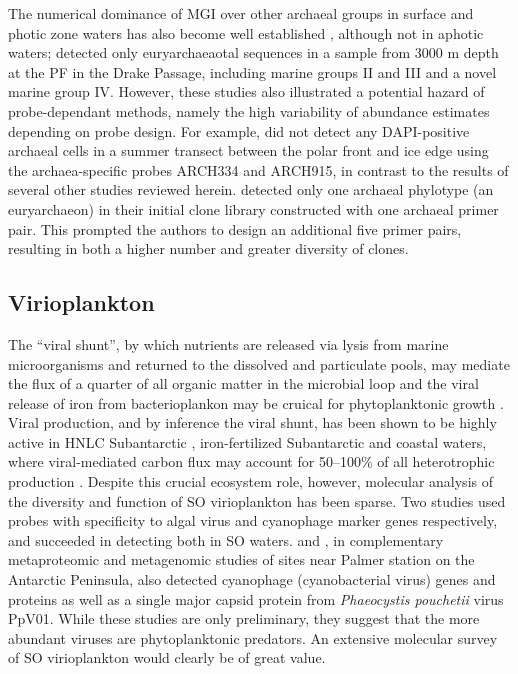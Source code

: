 The numerical dominance of \ac{MGI} over other archaeal groups in surface and photic zone waters has also become well established \citep[e.g.][]{DeLong:1994id,Massana:2000bg}, although not in aphotic waters; \citet{LopezGarcia:2001vp} detected only euryarchaeaotal sequences in a sample from 3000 m depth at the \ac{PF} in the Drake Passage, including marine groups II and III and a novel marine group IV.
However, these studies also illustrated a potential hazard of probe-dependant methods, namely the high variability of abundance estimates depending on probe design.
For example, \cite{Simon:1999ux} did not detect any DAPI-positive archaeal cells in a summer transect between the polar front and ice edge using the archaea-specific probes ARCH334 and ARCH915, in contrast to the results of several other studies reviewed herein.
\citet{LopezGarcia:2001vp} detected only one archaeal phylotype (an euryarchaeon) in their initial clone library constructed with one archaeal primer pair.
This prompted the authors to design an additional five primer pairs, resulting in both a higher number and greater diversity of clones.

\subsection{Virioplankton}

The ``viral shunt'', by which nutrients are released via lysis from marine microorganisms and returned to the dissolved and particulate pools, may mediate the flux of a quarter of all organic matter in the microbial loop \cite{Wilhelm:1999ds} and the viral release of iron from bacterioplankon may be cruical for phytoplanktonic growth \cite{Poorvin:2004vo}.
Viral production, and by inference the viral shunt, has been shown to be highly active in \ac{HNLC} Subantarctic \cite{Evans:2009ex}, iron-fertilized Subantarctic \cite{Weinbauer:2009tl} and coastal waters, where viral-mediated carbon flux may account for 50--100\% of all heterotrophic production \cite{GuixaBoixereu:2002vh}.
Despite this crucial ecosystem role, however, molecular analysis of the diversity and function of \ac{SO} virioplankton has been sparse.
Two studies \cite{Short:2002kk,Short:2005df} used probes with specificity to algal virus and cyanophage marker genes respectively, and succeeded in detecting both in \ac{SO} waters.
\cite{Williams:2012bs} and \cite{Grzymski:2012ej}, in complementary metaproteomic and metagenomic studies of sites near Palmer station on the Antarctic Peninsula, also detected cyanophage (cyanobacterial virus) genes and proteins as well as a single major capsid protein from \emph{Phaeocystis pouchetii} virus PpV01.
While these studies are only preliminary, they suggest that the more abundant viruses are phytoplanktonic predators.
An extensive molecular survey of SO virioplankton \citep[in the nature of][]{Angly:2006wf} would clearly be of great value.

